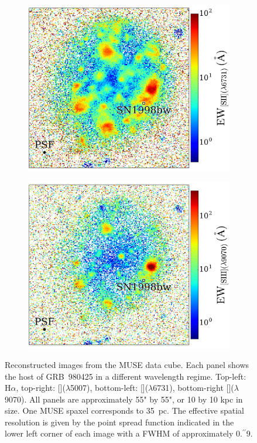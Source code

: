 \documentclass[traditabstract]{aa}
\newcommand{\farc}{\hbox{$.\!\!^{\prime\prime}$}}
\newcommand{\ha}{H$\alpha$}
\newcommand{\sii}{[\ion{S}{ii}]}
\newcommand{\siii}{[\ion{S}{iii}]}
\newcommand{\oiii}{[\ion{O}{iii}]}
\begin{document}
\begin{figure}
\begin{subfigure}{.24\textwidth}
\end{subfigure}
\begin{subfigure}{.24\textwidth}
  \includegraphics[width=1.0\linewidth]{Figs/MUSE_SN1998bw_SIIEW.pdf}
\end{subfigure}
\begin{subfigure}{.24\textwidth}
  \includegraphics[width=1.0\linewidth]{Figs/MUSE_SN1998bw_SIIIEW.pdf}
\end{subfigure}
\caption{Reconstructed images from the MUSE data cube. Each panel shows the host of GRB~980425 in a different wavelength regime. Top-left: \ha, top-right: \oiii($\lambda$5007), bottom-left: \sii($\lambda$6731), bottom-right \siii($\lambda$9070). All panels are approximately 55" by 55", or 10 by 10 kpc in size. One MUSE spaxel corresponds to 35~pc. The effective spatial resolution is given by the point spread function indicated in the lower left corner of each image with a FWHM of approximately 0\farc{9}.}
\label{fig:EW}
\end{figure}
\end{document}
